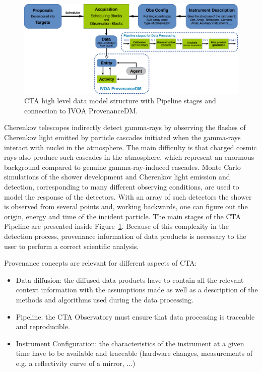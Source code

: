 \begin{figure}
\centering
\includegraphics[width=\textwidth]{CTA_DM_high_level.png}
\caption{CTA high level data model structure with Pipeline stages and connection to IVOA ProvenanceDM.}
\label{fig:cta_dm}
\end{figure}

Cherenkov telescopes indirectly detect gamma-rays by observing the flashes of Cherenkov light emitted by particle cascades initiated when the gamma-rays interact with nuclei in the atmosphere. The main difficulty  is that charged cosmic rays also produce such cascades in the atmosphere, which represent an enormous background compared to genuine gamma-ray-induced cascades. Monte Carlo simulations of the shower development and Cherenkov light emission and detection, corresponding to many different observing conditions, are used to model the response of the detectors.  With an array of such detectors the shower is observed  from several points and, working backwards, one can figure out the origin, energy and time of the incident particle. The main stages of the CTA Pipeline are presented inside Figure~\ref{fig:cta_dm}. Because of this complexity in the detection process, provenance information of data products is necessary to the user to perform a correct scientific analysis.

Provenance concepts are relevant for different aspects of CTA:
\begin{itemize}
\item Data diffusion: the diffused data products have to contain all the relevant context information with the assumptions made as well as a description of the methods and algorithms used during the data processing.
\item Pipeline: the CTA Observatory must ensure that data processing is traceable and reproducible.
\item Instrument Configuration: the characteristics of the instrument at a given time have to be available and traceable (hardware changes, measurements of e.g. a reflectivity curve of a mirror, ...)
\end{itemize}

